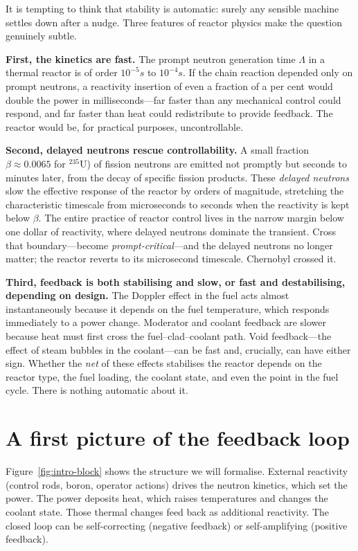 It is tempting to think that stability is automatic: surely any sensible machine
settles down after a nudge. Three features of reactor physics make the question
genuinely subtle.

\textbf{First, the kinetics are fast.} The prompt neutron generation time
$\Lambda$ in a thermal reactor is of order $10^{-5}\unit{s}$ to
$10^{-4}\unit{s}$. If the chain reaction depended only on prompt neutrons, a
reactivity insertion of even a fraction of a per cent would double the power in
milliseconds---far faster than any mechanical control could respond, and far
faster than heat could redistribute to provide feedback. The reactor would be,
for practical purposes, uncontrollable.

\textbf{Second, delayed neutrons rescue controllability.} A small fraction
$\beta\approx 0.0065$ for $^{235}$U) of fission neutrons are emitted not promptly
but seconds to minutes later, from the decay of specific fission products. These
\emph{delayed neutrons} slow the effective response of the reactor by orders of
magnitude, stretching the characteristic timescale from microseconds to seconds
when the reactivity is kept below $\beta$. The entire practice of reactor
control lives in the narrow margin below one dollar of reactivity, where delayed
neutrons dominate the transient. Cross that boundary---become
\emph{prompt-critical}---and the delayed neutrons no longer matter; the reactor
reverts to its microsecond timescale. Chernobyl crossed it.

\textbf{Third, feedback is both stabilising and slow, or fast and
destabilising, depending on design.} The Doppler effect in the fuel acts almost
instantaneously because it depends on the fuel temperature, which responds
immediately to a power change. Moderator and coolant feedback are slower because
heat must first cross the fuel--clad--coolant path. Void feedback---the effect
of steam bubbles in the coolant---can be fast and, crucially, can have either
sign. Whether the \emph{net} of these effects stabilises the reactor depends on
the reactor type, the fuel loading, the coolant state, and even the point in the
fuel cycle. There is nothing automatic about it.

\section{A first picture of the feedback loop}

Figure~\ref{fig:intro-block} shows the structure we will formalise. External
reactivity (control rods, boron, operator actions) drives the neutron kinetics,
which set the power. The power deposits heat, which raises temperatures and
changes the coolant state. Those thermal changes feed back as additional
reactivity. The closed loop can be self-correcting (negative feedback) or
self-amplifying (positive feedback).

